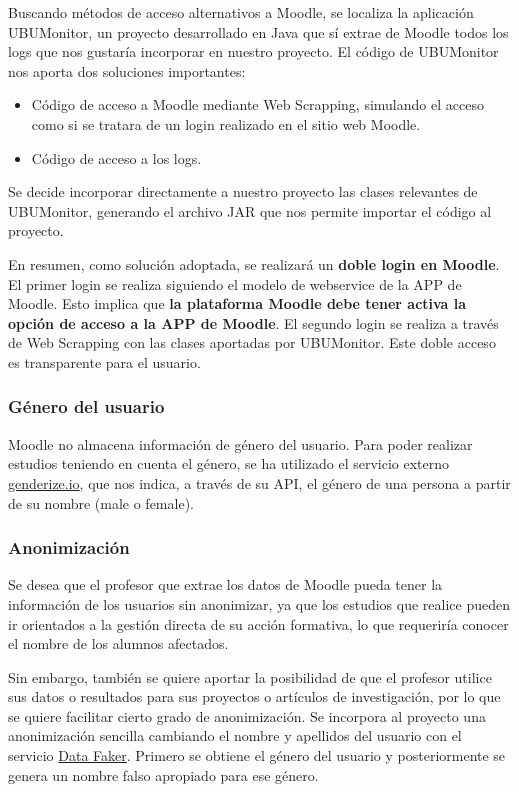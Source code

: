 Buscando métodos de acceso alternativos a Moodle, se localiza la aplicación UBUMonitor, un proyecto desarrollado 
en Java que sí extrae de Moodle todos los logs que nos gustaría incorporar en nuestro proyecto. El código de UBUMonitor 
nos aporta dos soluciones importantes: 

\begin{itemize}
	\item Código de acceso a Moodle mediante Web Scrapping, simulando el acceso como si se tratara de un login realizado en el sitio web Moodle. 
	\item Código de acceso a los logs.
\end{itemize}

Se decide incorporar directamente a nuestro proyecto las clases relevantes de UBUMonitor, generando el archivo JAR que nos
permite importar el código al proyecto. 
\

En resumen, como solución adoptada, se realizará un \textbf{doble login en Moodle}. El primer login se realiza siguiendo el modelo de webservice de la APP de Moodle. Esto 
implica que \textbf{la plataforma Moodle debe tener activa la opción de acceso a la APP de Moodle}. El segundo login se realiza
a través de Web Scrapping con las clases aportadas por UBUMonitor. Este doble acceso es transparente para el usuario. 

\subsubsection{Género del usuario}

Moodle no almacena información de género del usuario. Para poder realizar estudios teniendo en cuenta el género, se ha 
utilizado el servicio externo \href{https://genderize.io/}{genderize.io}, que nos indica, a través de su API, el género de una 
persona a partir de su nombre (male o female). 


\subsubsection{Anonimización}

Se desea que el profesor que extrae los datos de Moodle pueda tener la información de los usuarios sin anonimizar, ya que los 
estudios que realice pueden ir orientados a la gestión directa de su acción formativa, lo que requeriría conocer el nombre
de los alumnos afectados. 
\

Sin embargo, también se quiere aportar la posibilidad de que el profesor utilice sus datos o resultados para sus 
proyectos o artículos de investigación, por lo que se quiere facilitar cierto grado de anonimización. Se incorpora al proyecto
una anonimización sencilla cambiando el nombre y apellidos del usuario con el servicio \href{https://www.datafaker.net/}{Data Faker}. Primero se obtiene el 
género del usuario y posteriormente se genera un nombre falso apropiado para ese género. 
\

